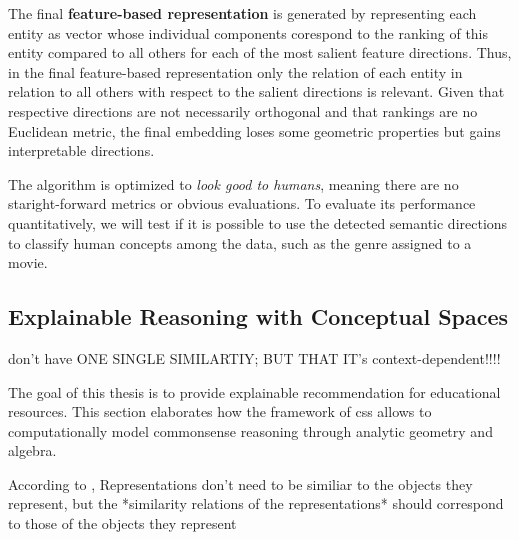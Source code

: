 The final \textbf{feature-based representation} is generated by representing each entity as vector whose individual components corespond to the ranking of this entity compared to all others for each of the most salient feature directions. Thus, in the final feature-based representation only the relation of each entity in relation to all others with respect to the salient directions is relevant. Given that respective directions are not necessarily orthogonal and that rankings are no Euclidean metric, the final embedding loses some geometric properties but gains interpretable directions.

The algorithm is optimized to \textit{look good to humans}, meaning there are no staright-forward metrics or obvious evaluations. To evaluate its performance quantitatively, we will test if it is possible to use the detected semantic directions to classify human concepts among the data, such as the genre assigned to a movie.



\subsection{Explainable Reasoning with Conceptual Spaces}
\label{sec:reasoning}




 don't have ONE SINGLE SIMILARTIY; BUT THAT IT's context-dependent!!!!


The goal of this thesis is to provide explainable recommendation for educational resources. This section elaborates how the framework of \glspl{cs} allows to computationally model commonsense reasoning through analytic geometry and algebra.


According to \cite{Gardenfors2000a}, Representations don't need to be similiar to the objects they represent, but the *similarity relations of the representations* should correspond to those of the objects they represent

